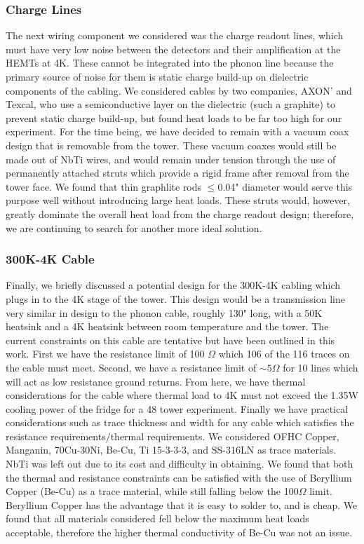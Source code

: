 \documentclass{report}
\begin{document}
\subsubsection{Charge Lines}
The next wiring component we considered was the charge readout lines, which must have very low noise between the detectors and their amplification at the HEMTs at 4K. These cannot be integrated into the phonon line because the primary source of noise for them is static charge build-up on dielectric components of the cabling. We considered cables by two companies, AXON' and Texcal, who use a semiconductive layer on the dielectric (such a graphite) to prevent static charge build-up, but found heat loads to be far too high for our experiment. For the time being, we have decided to remain with a vacuum coax design that is removable from the tower. These vacuum coaxes would still be made out of NbTi wires, and would remain under tension through the use of permanently attached struts which provide a rigid frame after removal from the tower face. We found that thin graphlite rods $\leq$0.04" diameter would serve this purpose well without introducing large heat loads. These struts would, however, greatly dominate the overall heat load from the charge readout design; therefore, we are continuing to search for another more ideal solution.

\subsubsection{300K-4K Cable}
Finally, we briefly discussed a potential design for the 300K-4K cabling which plugs in to the 4K stage of the tower. This design would be a transmission line very similar in design to the phonon cable, roughly 130" long, with a 50K heatsink and a 4K heatsink between room temperature and the tower. The current constraints on this cable are tentative but have been outlined in this work. First we have the resistance limit of 100 $\Omega$ which 106 of the 116 traces on the cable must meet. Second, we have a resistance limit of $\sim 5 \Omega$ for 10 lines which will act as low resistance ground returns. From here, we have thermal considerations for the cable where thermal load to 4K must not exceed the 1.35W cooling power of the fridge for a 48 tower experiment. Finally we have practical considerations such as trace thickness and width for any cable which satisfies the resistance requirements/thermal requirements. We considered OFHC Copper, Manganin, 70Cu-30Ni, Be-Cu, Ti 15-3-3-3, and SS-316LN as trace materials. NbTi was left out due to its cost and difficulty in obtaining. We found that both the thermal and resistance constraints can be satisfied with the use of Beryllium Copper (Be-Cu) as a trace material, while still falling below the 100$\Omega$ limit. Beryllium Copper has the advantage that it is easy to solder to, and is cheap. We found that all materials considered fell below the maximum heat loads acceptable, therefore the higher thermal conductivity of Be-Cu was not an issue.
\end{document}
